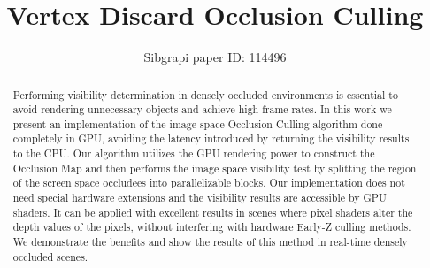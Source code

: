 \documentclass[10pt, conference]{IEEEtran}
\begin{document}
%
\title{Vertex Discard Occlusion Culling}

\newif\iffinal
\finalfalse
\newcommand{\jemsid}{114496}



\iffinal
  \author{%
    \IEEEauthorblockN{Matias N. Leone, Leandro R. Barbagallo, Mariano M. Banquiero}
    \IEEEauthorblockA{%
      Explotaci{\'o}n de GPUs y Gr{\'a}ficos Por Computadora - GIGC\\
      Departamento de Ingenier{\'i}a en Sistemas de Informaci{\'o}n, Universidad Tecnol{\'o}gica Nacional\\
      Buenos Aires, Argentina\\
      Email: \{mleone, lbarbagallo, mbanquiero\}@frba.utn.edu.ar}
  
  }
\else
  \author{Sibgrapi paper ID: \jemsid \\ }
\fi







\maketitle


\begin{abstract}
Performing visibility determination in densely occluded environments is essential to avoid rendering unnecessary objects and achieve high frame rates. 
In this work we present an implementation of the image space Occlusion Culling algorithm done completely in GPU, avoiding the latency introduced by returning 
the visibility results to the CPU. 
Our algorithm utilizes the GPU rendering power to construct the Occlusion Map and then performs the image space visibility test by splitting the region of 
the screen space occludees into parallelizable blocks. 
Our implementation does not need special hardware extensions and the visibility results are accessible by GPU shaders. It can be applied with excellent 
results in scenes where pixel shaders alter the depth values of the pixels, without interfering with hardware Early-Z culling methods. 
We demonstrate the benefits and show the results of this method in real-time densely occluded scenes.
\end{abstract}
\end{document}
